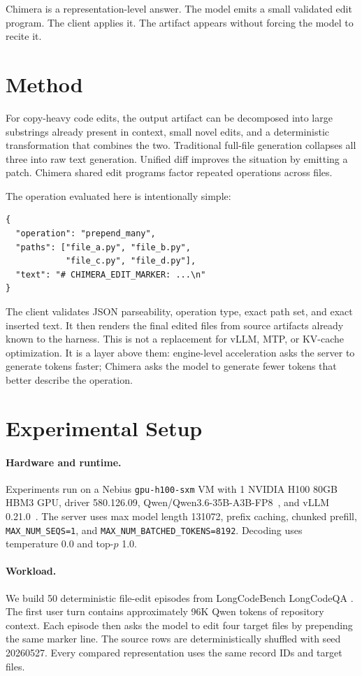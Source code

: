 \documentclass[10pt,twocolumn]{article}
\newcommand{\method}{Chimera}
\begin{document}
\method{} is a representation-level answer. The model emits a small validated
edit program. The client applies it. The artifact appears without forcing the
model to recite it.

\section{Method}

For copy-heavy code edits, the output artifact can be decomposed into large
substrings already present in context, small novel edits, and a deterministic
transformation that combines the two. Traditional full-file generation collapses
all three into raw text generation. Unified diff improves the situation by
emitting a patch. \method{} shared edit programs factor repeated operations
across files.

The operation evaluated here is intentionally simple:
\begin{verbatim}
{
  "operation": "prepend_many",
  "paths": ["file_a.py", "file_b.py",
            "file_c.py", "file_d.py"],
  "text": "# CHIMERA_EDIT_MARKER: ...\n"
}
\end{verbatim}

The client validates JSON parseability, operation type, exact path set, and
exact inserted text. It then renders the final edited files from source
artifacts already known to the harness. This is not a replacement for vLLM,
MTP, or KV-cache optimization. It is a layer above them: engine-level
acceleration asks the server to generate tokens faster; \method{} asks the
model to generate fewer tokens that better describe the operation.

\section{Experimental Setup}

\paragraph{Hardware and runtime.}
Experiments run on a Nebius \texttt{gpu-h100-sxm} VM with 1 NVIDIA H100 80GB
HBM3 GPU, driver 580.126.09, Qwen/Qwen3.6-35B-A3B-FP8~\citep{qwen36fp8}, and
vLLM 0.21.0~\citep{vllm}. The server uses max model length 131072, prefix
caching, chunked prefill, \texttt{MAX\_NUM\_SEQS=1}, and
\texttt{MAX\_NUM\_BATCHED\_TOKENS=8192}. Decoding uses temperature 0.0 and
top-$p$ 1.0.

\paragraph{Workload.}
We build 50 deterministic file-edit episodes from LongCodeBench LongCodeQA
\citep{longcodebench2025}. The first user turn contains approximately 96K Qwen
tokens of repository context. Each episode then asks the model to edit four
target files by prepending the same marker line. The source rows are
deterministically shuffled with seed 20260527. Every compared representation
uses the same record IDs and target files.
\end{document}

